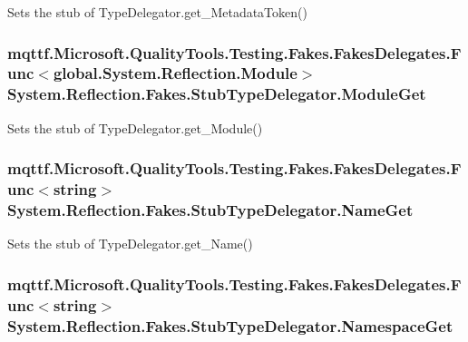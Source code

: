 Sets the stub of Type\-Delegator.\-get\-\_\-\-Metadata\-Token()

\hypertarget{class_system_1_1_reflection_1_1_fakes_1_1_stub_type_delegator_aecbb8b9265c6b5aa28201110f7ce7e54}{
\subsubsection[{Module\-Get}]{\setlength{\rightskip}{0pt plus 5cm}mqttf.\-Microsoft.\-Quality\-Tools.\-Testing.\-Fakes.\-Fakes\-Delegates.\-Func$<$global.\-System.\-Reflection.\-Module$>$ System.\-Reflection.\-Fakes.\-Stub\-Type\-Delegator.\-Module\-Get}}\label{class_system_1_1_reflection_1_1_fakes_1_1_stub_type_delegator_aecbb8b9265c6b5aa28201110f7ce7e54}


Sets the stub of Type\-Delegator.\-get\-\_\-\-Module()

\hypertarget{class_system_1_1_reflection_1_1_fakes_1_1_stub_type_delegator_ad0677885a645b4a2671cde8fcb2f74d3}{
\subsubsection[{Name\-Get}]{\setlength{\rightskip}{0pt plus 5cm}mqttf.\-Microsoft.\-Quality\-Tools.\-Testing.\-Fakes.\-Fakes\-Delegates.\-Func$<$string$>$ System.\-Reflection.\-Fakes.\-Stub\-Type\-Delegator.\-Name\-Get}}\label{class_system_1_1_reflection_1_1_fakes_1_1_stub_type_delegator_ad0677885a645b4a2671cde8fcb2f74d3}


Sets the stub of Type\-Delegator.\-get\-\_\-\-Name()

\hypertarget{class_system_1_1_reflection_1_1_fakes_1_1_stub_type_delegator_ac8432f7439d1a32c17db17694f9958d8}{
\subsubsection[{Namespace\-Get}]{\setlength{\rightskip}{0pt plus 5cm}mqttf.\-Microsoft.\-Quality\-Tools.\-Testing.\-Fakes.\-Fakes\-Delegates.\-Func$<$string$>$ System.\-Reflection.\-Fakes.\-Stub\-Type\-Delegator.\-Namespace\-Get}}\label{class_system_1_1_reflection_1_1_fakes_1_1_stub_type_delegator_ac8432f7439d1a32c17db17694f9958d8}


